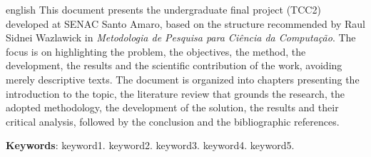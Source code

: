 \documentclass[
    12pt,                %
    openright,           %
    oneside,             %
    a4paper,             %
    english,             %
    brazil               %
]{abntex2}
\begin{document}
\begin{resumo}[Abstract]
 \begin{otherlanguage*}{english}
   This document presents the undergraduate final project (TCC2) developed at SENAC Santo Amaro, based on the structure recommended by Raul Sidnei Wazlawick in \textit{Metodologia de Pesquisa para Ciência da Computação}. The focus is on highlighting the problem, the objectives, the method, the development, the results and the scientific contribution of the work, avoiding merely descriptive texts. The document is organized into chapters presenting the introduction to the topic, the literature review that grounds the research, the adopted methodology, the development of the solution, the results and their critical analysis, followed by the conclusion and the bibliographic references.

   \vspace{\onelineskip}

   \noindent
   \textbf{Keywords}: keyword1. keyword2. keyword3. keyword4. keyword5.
 \end{otherlanguage*}
\end{resumo}

\listoffigures*
\cleardoublepage

\listoftables*
\cleardoublepage

\end{document}
